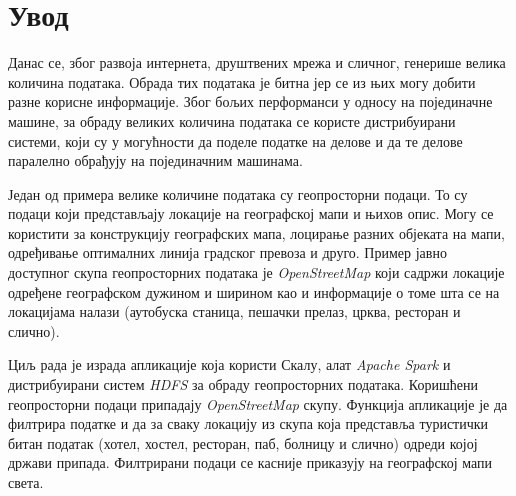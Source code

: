 \documentclass[12pt,oneside]{memoir}
\begin{document}
\frontmatter
\naslovna
\komisija
\apstrakt
\tableofcontents*

\mainmatter


\chapter{Увод}
\label{chp:uvod}

Данас се, због развоја интернета, друштвених мрежа и сличног, генерише велика количина података. Обрада тих података је битна јер се из њих могу добити разне корисне информације. Због бољих перформанси у односу на појединачне машине, за обраду великих количина података се користе дистрибуирани системи, који су у могућности да поделе податке на делове и да те делове паралелно обрађују на појединачним машинама.

Један од примера велике количине података су геопросторни подаци. То су подаци који представљају локације на географској мапи и њихов опис. Могу се користити за конструкцију географских мапа, лоцирање разних објеката на мапи, одређивање оптималних линија градског превоза и друго. Пример јавно доступног скупа геопросторних података је \textit{OpenStreetMap} који садржи локације одређене географском дужином и ширином као и информације о томе шта се на локацијама налази (аутобуска станица, пешачки прелаз, црква, ресторан и слично).

Циљ рада је израда апликације која користи Скалу, алат \textit{Apache Spark} и дистрибуирани систем \textit{HDFS} за обраду геопросторних података. Коришћени геопросторни подаци припадају \textit{OpenStreetMap} скупу. Функција апликације је да филтрира податке и да за сваку локацију из скупа која представља туристички битан податак (хотел, хостел, ресторан, паб, болницу и слично) одреди којој држави припада. Филтрирани подаци се касније приказују на географској мапи света.
\end{document}
